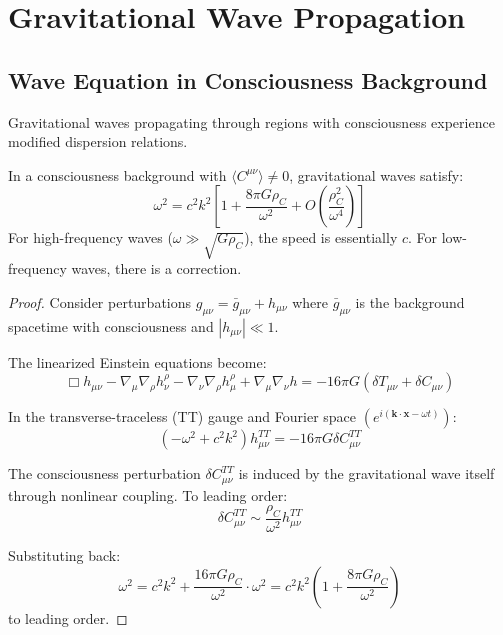 \section{Gravitational Wave Propagation}

\subsection{Wave Equation in Consciousness Background}

Gravitational waves propagating through regions with consciousness experience modified dispersion relations.

\begin{theorem}\label{thm:gw-consciousness-dispersion}
In a consciousness background with $\langle C^{\mu\nu} \rangle \neq 0$, gravitational waves satisfy:
\begin{equation}
\boxed{\omega^2 = c^2 k^2 \left[ 1 + \frac{8\pi G \rho_C}{\omega^2} + O\left( \frac{\rho_C^2}{\omega^4} \right) \right]}
\end{equation}
For high-frequency waves ($\omega \gg \sqrt{G\rho_C}$), the speed is essentially $c$. For low-frequency waves, there is a correction.
\end{theorem}

\begin{proof}
Consider perturbations $g_{\mu\nu} = \bar{g}_{\mu\nu} + h_{\mu\nu}$ where $\bar{g}_{\mu\nu}$ is the background spacetime with consciousness and $|h_{\mu\nu}| \ll 1$.

The linearized Einstein equations become:
\begin{equation}
\Box h_{\mu\nu} - \nabla_\mu \nabla_\rho h^\rho_\nu - \nabla_\nu \nabla_\rho h^\rho_\mu + \nabla_\mu \nabla_\nu h = -16\pi G \left( \delta T_{\mu\nu} + \delta C_{\mu\nu} \right)
\end{equation}

In the transverse-traceless (TT) gauge and Fourier space $(e^{i(\mathbf{k} \cdot \mathbf{x} - \omega t)})$:
\begin{equation}
(-\omega^2 + c^2 k^2) h^{TT}_{\mu\nu} = -16\pi G \delta C^{TT}_{\mu\nu}
\end{equation}

The consciousness perturbation $\delta C^{TT}_{\mu\nu}$ is induced by the gravitational wave itself through nonlinear coupling. To leading order:
\begin{equation}
\delta C^{TT}_{\mu\nu} \sim \frac{\rho_C}{\omega^2} h^{TT}_{\mu\nu}
\end{equation}

Substituting back:
\begin{equation}
\omega^2 = c^2 k^2 + \frac{16\pi G \rho_C}{\omega^2} \cdot \omega^2 = c^2 k^2 \left( 1 + \frac{8\pi G \rho_C}{\omega^2} \right)
\end{equation}
to leading order.
\end{proof}

